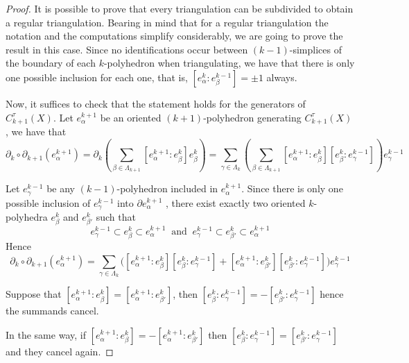 \begin{proof}
    It is possible to prove that every triangulation can be subdivided to obtain a regular triangulation. Bearing in mind that for a regular triangulation the notation and the computations simplify considerably, we are going to prove the result in this case. Since no identifications occur between $(k-1)$-simplices of the boundary of each $k$-polyhedron when triangulating, we have that there is only one possible inclusion for each one, that is, $[e^k_{\alpha} : e^{k-1}_{\beta}]=\pm 1$ always.

    Now, it suffices to check that the statement holds for the generators of $C^{\tau}_{k+1}(X)$. Let $e^{k+1}_{\alpha}$ be an oriented $(k+1)$-polyhedron generating $C^{\tau}_{k+1}(X)$, we have that
    \begin{equation*}
        \partial_{k}\circ\partial_{k+1}(e^{k+1}_{\alpha}) = \partial_{k}\left( \sum_{\beta\in\Lambda_{k+1}} [e^{k+1}_{\alpha} : e^{k}_{\beta}]e^{k}_{\beta} \right) = \sum_{\gamma\in\Lambda_{k}} \left( \sum_{\beta\in\Lambda_{k+1}} [e^{k+1}_{\alpha} : e^{k}_{\beta}][e^{k}_{\beta} : e^{k-1}_{\gamma}] \right) e^{k-1}_{\gamma} %
    \end{equation*}

    Let $e^{k-1}_{\gamma}$ be any $(k-1)$-polyhedron included in $e^{k+1}_{\alpha}$. Since there is only one possible inclusion of $e^{k-1}_{\gamma}$ into $\partial e^{k+1}_{\alpha}$ , there exist exactly two oriented $k$-polyhedra $e^{k}_{\beta}$ and $e^{k}_{\beta'}$ such that
    \begin{equation*}
        e^{k-1}_{\gamma}\subset e^{k}_{\beta} \subset e^{k+1}_{\alpha}~\text{ and }~ e^{k-1}_{\gamma}\subset e^{k}_{\beta'}\subset e^{k+1}_{\alpha}
    \end{equation*}
    Hence
    \begin{equation*}
        \partial_{k}\circ\partial_{k+1}(e^{k+1}_{\alpha}) = \sum_{\gamma\in\Lambda_{k}}\big( [e^{k+1}_{\alpha} : e^{k}_{\beta}][e^{k}_{\beta} : e^{k-1}_{\gamma}] + [e^{k+1}_{\alpha} : e^{k}_{\beta'}][e^{k}_{\beta'} : e^{k-1}_{\gamma}] \big) e^{k-1}_{\gamma}
    \end{equation*}

    Suppose that $[e^{k+1}_{\alpha} : e^{k}_{\beta}]=[e^{k+1}_{\alpha} : e^{k}_{\beta'}]$, then $[e^{k}_{\beta} : e^{k-1}_{\gamma}]=-[e^{k}_{\beta'} : e^{k-1}_{\gamma}]$ hence the summands cancel.

    In the same way, if $[e^{k+1}_{\alpha} : e^{k}_{\beta}]=-[e^{k+1}_{\alpha} : e^{k}_{\beta'}]$ then $[e^{k}_{\beta} : e^{k-1}_{\gamma}]=[e^{k}_{\beta'} : e^{k-1}_{\gamma}]$ and they cancel again.

\end{proof}


